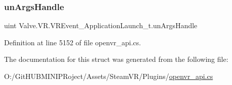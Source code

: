 \mbox{\label{struct_valve_1_1_v_r_1_1_v_r_event___application_launch__t_a9f356dd1bf92bb685566d0e824f7daca}} 
\subsubsection{\texorpdfstring{unArgsHandle}{unArgsHandle}}
{\footnotesize\ttfamily uint Valve.\+V\+R.\+V\+R\+Event\+\_\+\+Application\+Launch\+\_\+t.\+un\+Args\+Handle}



Definition at line 5152 of file openvr\+\_\+api.\+cs.



The documentation for this struct was generated from the following file\+:\begin{DoxyCompactItemize}
\item 
O\+:/\+Git\+H\+U\+B\+M\+I\+N\+I\+P\+Roject/\+Assets/\+Steam\+V\+R/\+Plugins/\mbox{\hyperlink{openvr__api_8cs}{openvr\+\_\+api.\+cs}}\end{DoxyCompactItemize}
